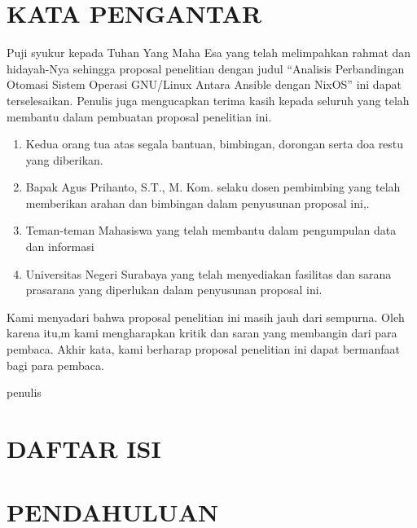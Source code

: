 \documentclass[10pt,]{report}
\begin{document}

\chapter*{KATA PENGANTAR}
\begin{justify}
	Puji syukur kepada Tuhan Yang Maha Esa yang telah melimpahkan rahmat dan
	hidayah-Nya sehingga proposal penelitian dengan judul “Analisis Perbandingan
	Otomasi Sistem Operasi GNU/Linux Antara Ansible dengan NixOS” ini
	dapat terselesaikan. Penulis juga mengucapkan terima kasih kepada seluruh
	yang telah membantu dalam pembuatan proposal penelitian ini.
	\begin{enumerate}[leftmargin=0.45cm]
		\item Kedua orang tua atas segala bantuan, bimbingan, dorongan serta doa restu yang diberikan.
		\item Bapak Agus Prihanto, S.T., M. Kom. selaku dosen pembimbing yang telah memberikan arahan dan bimbingan dalam penyusunan proposal ini,.
		\item Teman-teman Mahasiswa yang telah membantu dalam pengumpulan data dan informasi
		\item Universitas Negeri Surabaya yang telah menyediakan fasilitas dan sarana prasarana yang diperlukan dalam penyusunan proposal ini.
	\end{enumerate}
	Kami menyadari bahwa proposal penelitian ini masih jauh dari sempurna. Oleh karena itu,m kami mengharapkan kritik dan saran yang membangin dari para pembaca.
	Akhir kata, kami berharap proposal penelitian ini dapat bermanfaat bagi para pembaca.
\end{justify}
\begin{FlushRight}
	penulis
\end{FlushRight}
\chapter*{DAFTAR ISI}
\tableofcontents
\chapter{PENDAHULUAN}
\end{document}
